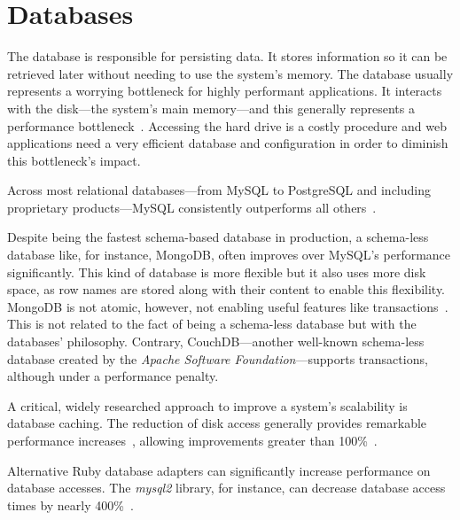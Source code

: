 \section{Databases} %
\label{state:sec:databases}
The database is responsible for persisting data. It stores information so it can be retrieved later without needing to use the system's memory.
The database usually represents a worrying bottleneck for highly performant applications. It interacts with the disk---the system's main memory---and this generally represents a performance bottleneck~\cite{memory_wall}. Accessing the hard drive is a costly procedure and web applications need a very efficient database and configuration in order to diminish this bottleneck's impact.

Across most relational databases---from MySQL to PostgreSQL and including proprietary products---MySQL consistently outperforms all others~\cite{benchmark_relational_databases}.

Despite being the fastest schema-based database in production, a schema-less database like, for instance, MongoDB, often improves over MySQL's performance significantly. This kind of database is more flexible but it also uses more disk space, as row names are stored along with their content to enable this flexibility. MongoDB is not atomic, however, not enabling useful features like transactions~\cite{mysql_to_mongodb}. This is not related to the fact of being a schema-less database but with the databases' philosophy. Contrary, CouchDB---another well-known schema-less database created by the \textit{Apache Software Foundation}---supports transactions, although under a performance penalty.

A critical, widely researched approach to improve a system's scalability is database caching. The reduction of disk access generally provides remarkable performance increases~\cite{scaling_rails_bottomup}, allowing improvements greater than 100\%~\cite{rapid_prototyping_mdd,high_performance_database_caching}.

Alternative Ruby database adapters can significantly increase performance on database accesses. The \textit{mysql2} library, for instance, can decrease database access times by nearly 400\%~\cite{brianmario_mysql2}.

